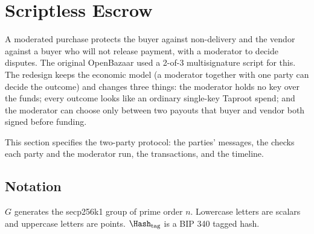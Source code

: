 \section{Scriptless Escrow}
\label{sec:escrow}

A moderated purchase protects the buyer against non-delivery and the vendor against a buyer who will not release payment, with a moderator to decide disputes. The original OpenBazaar used a 2-of-3 multisignature script for this. The redesign keeps the economic model (a moderator together with one party can decide the outcome) and changes three things: the moderator holds no key over the funds; every outcome looks like an ordinary single-key Taproot spend; and the moderator can choose only between two payouts that buyer and vendor both signed before funding.

This section specifies the two-party protocol: the parties' messages, the checks each party and the moderator run, the transactions, and the timeline.

\subsection{Notation}
\label{sec:escrow-notation}

$G$ generates the secp256k1 group of prime order $n$. Lowercase letters are scalars and uppercase letters are points. $\Hash_{\mathrm{tag}}$ is a BIP 340 tagged hash.


